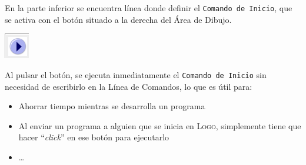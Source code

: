 En la parte inferior se encuentra l\'inea donde definir el
\texttt{Comando de Inicio}, que se activa con el bot\'on situado a la derecha
del \'Area de Dibujo.
\begin{center}
   \includegraphics[scale=0.5]{Imagenes/02_Caracteristicas/Boton_Inicio.png}
\end{center}
Al pulsar el bot\'on, se ejecuta inmediatamente el \texttt{Comando de Inicio}
sin necesidad de escribirlo en la L\'inea de Comandos, lo que es \'util para:
\begin{itemize}
   \item Ahorrar tiempo mientras se desarrolla un programa
   \item Al enviar un programa a alguien que se inicia en \textsc{Logo}, simplemente
      tiene que hacer ``\textit{click}'' en ese bot\'on para ejecutarlo
   \item \ldots \\
\end{itemize}

